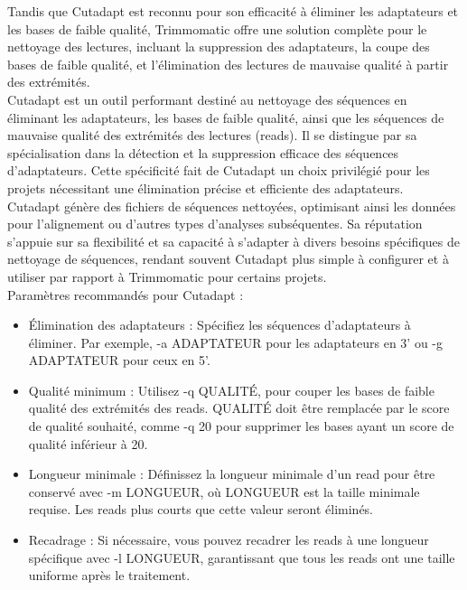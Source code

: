 \documentclass{report}
\begin{document}
Tandis que Cutadapt est reconnu pour son efficacité à éliminer les adaptateurs et les bases de faible qualité, Trimmomatic offre une solution complète pour le nettoyage des lectures, incluant la suppression des adaptateurs, la coupe des bases de faible qualité, et l'élimination des lectures de mauvaise qualité à partir des extrémités. \\

Cutadapt est un outil performant destiné au nettoyage des séquences en éliminant les adaptateurs, les bases de faible qualité, ainsi que les séquences de mauvaise qualité des extrémités des lectures (reads). Il se distingue par sa spécialisation dans la détection et la suppression efficace des séquences d'adaptateurs. Cette spécificité fait de Cutadapt un choix privilégié pour les projets nécessitant une élimination précise et efficiente des adaptateurs.\\

Cutadapt génère des fichiers de séquences nettoyées, optimisant ainsi les données pour l'alignement ou d'autres types d'analyses subséquentes. Sa réputation s'appuie sur sa flexibilité et sa capacité à s'adapter à divers besoins spécifiques de nettoyage de séquences, rendant souvent Cutadapt plus simple à configurer et à utiliser par rapport à Trimmomatic pour certains projets.\\

\noindent Paramètres recommandés pour Cutadapt :
\begin{itemize}
    \item Élimination des adaptateurs : Spécifiez les séquences d'adaptateurs à éliminer. Par exemple, -a ADAPTATEUR pour les adaptateurs en 3' ou -g ADAPTATEUR pour ceux en 5'.
    \item Qualité minimum : Utilisez -q QUALITÉ, pour couper les bases de faible qualité des extrémités des reads. QUALITÉ doit être remplacée par le score de qualité souhaité, comme -q 20 pour supprimer les bases ayant un score de qualité inférieur à 20.
    \item Longueur minimale : Définissez la longueur minimale d'un read pour être conservé avec -m LONGUEUR, où LONGUEUR est la taille minimale requise. Les reads plus courts que cette valeur seront éliminés.
    \item Recadrage : Si nécessaire, vous pouvez recadrer les reads à une longueur spécifique avec -l LONGUEUR, garantissant que tous les reads ont une taille uniforme après le traitement.
\end{itemize} \vspace{.5cm}
\end{document}
